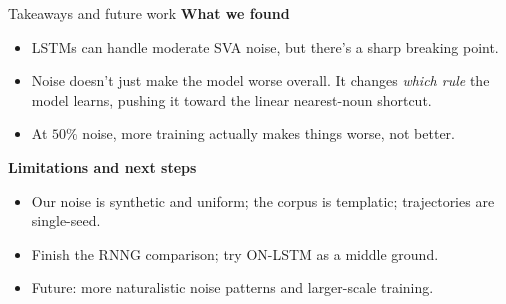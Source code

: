 \begin{frame}{Takeaways and future work}
  \textbf{What we found}
  \begin{itemize}
    \item LSTMs can handle moderate SVA noise, but there's a sharp breaking point.
    \item Noise doesn't just make the model worse overall. It changes \emph{which rule}
      the model learns, pushing it toward the linear nearest-noun shortcut.
    \item At $50\%$ noise, more training actually makes things worse, not better.
  \end{itemize}
  \vspace{0.3cm}
  \textbf{Limitations and next steps}
  \begin{itemize}
    \item Our noise is synthetic and uniform; the corpus is templatic; trajectories
      are single-seed.
    \item Finish the RNNG comparison; try ON-LSTM as a middle ground.
    \item Future: more naturalistic noise patterns and larger-scale training.
  \end{itemize}
\end{frame}
